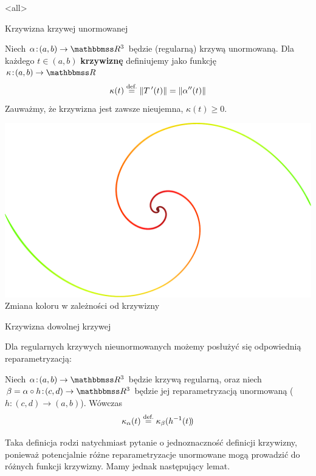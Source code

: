 \mode<all>{}
\begin{frame}{Krzywizna krzywej unormowanej}
\begin{definicja}
Niech $\alpha\colon(a,b)\to \R^3$ będzie (regularną) krzywą unormowaną. Dla każdego $t\in (a,b)$ \textbf{krzywiznę} definiujemy jako funkcję $\kappa\colon (a,b)\to\R$
\[\kappa(t)\define\|T\,'(t)\|=\|\alpha''(t)\|\]
Zauważmy, że krzywizna jest zawsze nieujemna, $\kappa(t)\geqslant 0$.
\end{definicja}
\end{frame}
\begin{frame}
\begin{center}
\includegraphics[scale=.5]{./pictures/curvature_color.pdf}\\
Zmiana koloru w zależności od krzywizny
\end{center}
\end{frame}
\begin{frame}{Krzywizna dowolnej krzywej}

Dla regularnych krzywych nieunormowanych możemy posłużyć się odpowiednią reparametryzacją:
\pause \begin{definicja}
Niech $\alpha\colon (a,b)\to \R^3$ będzie krzywą regularną, oraz niech $\beta=\alpha\circ h \colon (c,d)\to \R^3$ będzie jej reparametryzacją unormowaną ($h\colon (c,d)\to (a,b)$). Wówczas \[\kappa_\alpha(t)\define\kappa_\beta(h^{-1} (t)\!)\]
\end{definicja}

\pause{}

\end{frame}
Taka definicja rodzi natychmiast pytanie o jednoznaczność definicji krzywizny, ponieważ potencjalnie różne reparametryzacje unormowane mogą prowadzić do różnych funkcji krzywizny. Mamy jednak następujący lemat.

